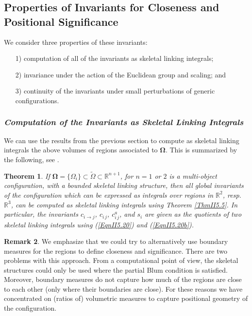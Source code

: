 \documentclass[10pt]{amsart}
\newtheorem{Thm}{Theorem}[section] \newtheorem{TitleThm}[Thm]{}
\theoremstyle{definition}
\theoremstyle{definition}
\newtheorem{Remark}[Thm]{Remark}
\numberwithin{equation}{section}
\newcommand{\R}{{\mathbb R}}
\def \bgW {\boldsymbol \Omega}
\def \gW {\Omega}
\begin{document}
\subsection*{Properties of Invariants for Closeness and Positional 
Significance} 
\par
We consider three properties of these invariants: \par
\begin{itemize} 
\item[1)] computation of all of the invariants as skeletal linking 
integrals;
\item[2)] invariance under the action of the Euclidean group and scaling; 
and 
\item[3)] continuity of the invariants under small perturbations of generic 
configurations.
\end{itemize}
\par
\subsubsection*{\it Computation of the Invariants as Skeletal Linking 
Integrals}  
We can use the results from the previous section to compute as skeletal 
linking integrals the above volumes of regions associated to $\bgW$.  This 
is summarized by the following, see \cite[Thm. 11.3]{DG}.
\begin{Thm}
\label{ThmII6.3}
If $\bgW = \{\gW_i\} \subset \tilde \gW \subset \R^{n+1}$, for $n = 1$ or 
$2$ is a multi-object configuration, with a bounded skeletal linking 
structure, then all global invariants of the configuration which can be 
expressed as integrals over regions in 
$\R^2$, resp. $\R^3$, can be computed as skeletal linking integrals using 
Theorem \ref{ThmII5.5}.  In particular, the invariants $c_{i\to j}$, 
$c_{i\, j}$, $c^a_{i\, j}$, and $s_i$ are given as the quotients of two 
skeletal linking integrals using (\ref{EqnII5.20}) and (\ref{EqnII5.20b}). 
\end{Thm}  
\par 
\begin{Remark}
\label{RemII5.2} 
\normalfont We emphasize that we could try to alternatively use 
boundary measures for the regions to define closeness and significance.  
There are two problems with this approach.  From a computational point of 
view, the skeletal structures could only be used where the partial Blum 
condition is 
satisfied.  Moreover, boundary measures do not capture how much of the 
regions are close to each other (only where their boundaries are close).  
For these reasons we have concentrated on (ratios of) volumetric 
measures to capture positional geometry of the configuration.   
\end{Remark}
\par
\end{document}
